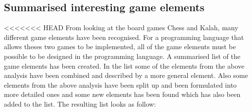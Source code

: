 \subsection{Summarised interesting game elements}
\label{subsec:differences}
<<<<<<< HEAD
From looking at the board games Chess and Kalah, many different game elements have been recognised. For a programming language that allows theses two games to be implemented, all of the game elements must be possible to be designed in the programming language. A summarised list of the game elements has been created. In the list some of the elements from the above analysis have been combined and described by a more general element. Also some elements from the above analysis have been split up and been formulated into more detailed ones and some new elements has been found which has also been added to the list. The resulting list looks as follow:  

